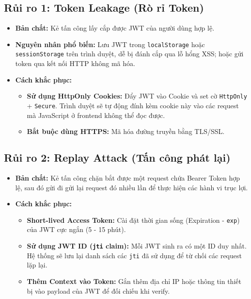 \documentclass[12pt,a4paper]{article}
\begin{document}
\subsection{Rủi ro 1: Token Leakage (Rò rỉ Token)}
\begin{itemize}
    \item \textbf{Bản chất:} Kẻ tấn công lấy cắp được JWT của người dùng hợp lệ.
    \item \textbf{Nguyên nhân phổ biến:} Lưu JWT trong \texttt{localStorage} hoặc \texttt{sessionStorage} trên trình duyệt, dễ bị đánh cắp qua lỗ hổng XSS; hoặc gửi token qua kết nối HTTP không mã hóa.
    \item \textbf{Cách khắc phục:}
    \begin{itemize}
        \item \textbf{Sử dụng HttpOnly Cookies:} Đẩy JWT vào Cookie và set cờ \texttt{HttpOnly} + \texttt{Secure}. Trình duyệt sẽ tự động đính kèm cookie này vào các request mà JavaScript ở frontend không thể đọc được.
        \item \textbf{Bắt buộc dùng HTTPS:} Mã hóa đường truyền bằng TLS/SSL.
    \end{itemize}
\end{itemize}

\subsection{Rủi ro 2: Replay Attack (Tấn công phát lại)}
\begin{itemize}
    \item \textbf{Bản chất:} Kẻ tấn công chặn bắt được một request chứa Bearer Token hợp lệ, sau đó gửi đi gửi lại request đó nhiều lần để thực hiện các hành vi trục lợi.
    \item \textbf{Cách khắc phục:}
    \begin{itemize}
        \item \textbf{Short-lived Access Token:} Cài đặt thời gian sống (Expiration - \texttt{exp}) của JWT cực ngắn (5 - 15 phút).
        \item \textbf{Sử dụng JWT ID (\texttt{jti} claim):} Mỗi JWT sinh ra có một ID duy nhất. Hệ thống sẽ lưu lại danh sách các \texttt{jti} đã sử dụng để từ chối các request lặp lại.
        \item \textbf{Thêm Context vào Token:} Gắn thêm địa chỉ IP hoặc thông tin thiết bị vào payload của JWT để đối chiếu khi verify.
    \end{itemize}
\end{itemize}
\end{document}
